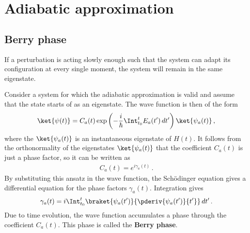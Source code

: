 
\section{Adiabatic approximation}
\subsection{Berry phase}

    \begin{theorem}
        If a perturbation is acting slowly enough such that the system can adapt its configuration at every single moment, the system will remain in the same eigenstate.
    \end{theorem}

    Consider a system for which the adiabatic approximation is valid and assume that the state starts of as an eigenstate. The wave function is then of the form
    \begin{gather}
        \ket{\psi(t)} = C_a(t)\exp\left(-\frac{i}{\hbar}\Int_{t_0}^tE_a(t')\,dt'\right)\ket{\psi_a(t)}\,,
    \end{gather}
    where the $\ket{\psi_a(t)}$ is an instantaneous eigenstate of $\widehat{H}(t)$. It follows from the orthonormality of the eigenstates $\ket{\psi_a(t)}$ that the coefficient $C_a(t)$ is just a phase factor, so it can be written as
    \begin{gather}
        C_a(t) = e^{i\gamma_a(t)}\,.
    \end{gather}
    By substituting this ansatz in the wave function, the Sch\"odinger equation gives a differential equation for the phase factors $\gamma_a(t)$. Integration gives
    \begin{gather}
        \label{perturbation:phase_factor}
        \gamma_a(t) = i\Int_{t_0}^t\braket{\psi_a(t')}{\pderiv{\psi_a(t')}{t'}}\,dt'\,.
    \end{gather}
    Due to time evolution, the wave function accumulates a phase through the coefficient $C_a(t)$. This phase is called the \textbf{Berry phase}.

